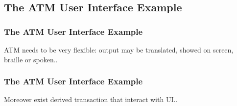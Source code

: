 \documentclass{beamer}
\begin{document}
\subsection{The ATM User Interface Example}
\begin{frame}
  \frametitle{The ATM User Interface Example}
  ATM needs to be very flexible: output may be translated, showed on screen, braille or spoken.. \\
  \begin{center}
  \end{center}
\end{frame}

\begin{frame}
  \frametitle{The ATM User Interface Example}
  Moreover exist derived transaction that interact with UI.. \\
  \begin{center}
  \end{center}
\end{frame}
\end{document}
